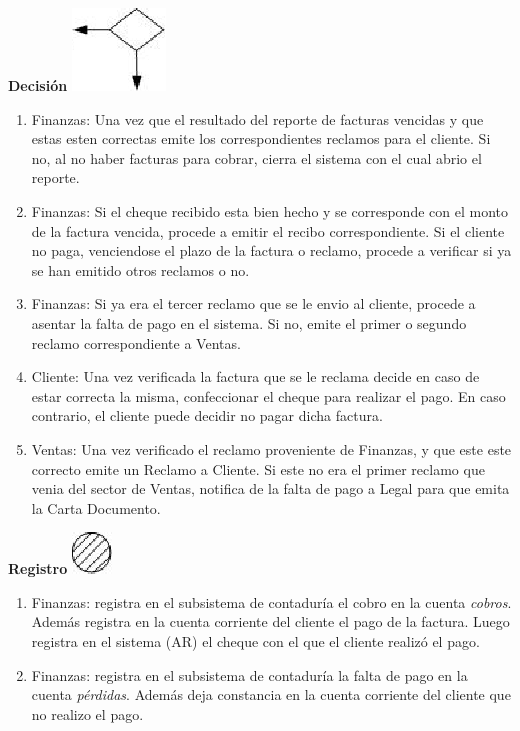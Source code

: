 \begin{center}
  \textbf{Decisión}
  \includegraphics{./Images/Simbolos/simbolo-Decision.png}
\end{center}
\begin{enumerate}
\item Finanzas: Una vez que el resultado del reporte de facturas vencidas y que estas esten correctas emite los correspondientes reclamos para el cliente. Si no, al no haber facturas para cobrar, cierra el sistema con el cual abrio el reporte.
\item Finanzas: Si el cheque recibido esta bien hecho y se corresponde con el monto de la factura vencida, procede a emitir el recibo correspondiente. Si el cliente no paga, venciendose el plazo de la factura o reclamo, procede a verificar si ya se han emitido otros reclamos o no.
\item Finanzas: Si ya era el tercer reclamo que se le envio al cliente, procede a asentar la falta de pago en el sistema. Si no, emite el primer o segundo reclamo correspondiente a Ventas.
\item Cliente: Una vez verificada la factura que se le reclama decide en caso de estar correcta la misma, confeccionar el cheque para realizar el pago. En caso contrario, el cliente puede decidir no pagar dicha factura.
\item Ventas: Una vez verificado el reclamo proveniente de Finanzas, y que este este correcto emite un Reclamo a Cliente. Si este no era el primer reclamo que venia del sector de Ventas, notifica de la falta de pago a Legal para que emita la Carta Documento.
\end{enumerate}

\begin{center}
  \textbf{Registro}
  \includegraphics{./Images/Simbolos/simbolo-Registro.png}
\end{center}
\begin{enumerate}
\item Finanzas: registra en el subsistema de contaduría el cobro en la cuenta \textit{cobros}. Además registra en la cuenta corriente del cliente el pago de la factura. Luego registra en el sistema (AR) el cheque con el que el cliente realizó el pago.
\item Finanzas: registra en el subsistema de contaduría la falta de pago en la cuenta \textit{pérdidas}. Además deja constancia en la cuenta corriente del cliente que no realizo el pago.
\end{enumerate}

